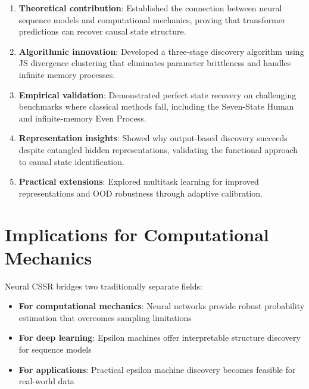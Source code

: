 \documentclass[11pt,a4paper]{report}
\theoremstyle{definition}
\begin{document}
\begin{enumerate}
    \item \textbf{Theoretical contribution}: Established the connection between neural sequence models and computational mechanics, proving that transformer predictions can recover causal state structure.
    
    \item \textbf{Algorithmic innovation}: Developed a three-stage discovery algorithm using JS divergence clustering that eliminates parameter brittleness and handles infinite memory processes.
    
    \item \textbf{Empirical validation}: Demonstrated perfect state recovery on challenging benchmarks where classical methods fail, including the Seven-State Human and infinite-memory Even Process.
    
    \item \textbf{Representation insights}: Showed why output-based discovery succeeds despite entangled hidden representations, validating the functional approach to causal state identification.
    
    \item \textbf{Practical extensions}: Explored multitask learning for improved representations and OOD robustness through adaptive calibration.
\end{enumerate}

\section{Implications for Computational Mechanics}
\label{sec:implications}

Neural CSSR bridges two traditionally separate fields:

\begin{notebox}
\begin{itemize}
    \item \textbf{For computational mechanics}: Neural networks provide robust probability estimation that overcomes sampling limitations
    \item \textbf{For deep learning}: Epsilon machines offer interpretable structure discovery for sequence models
    \item \textbf{For applications}: Practical epsilon machine discovery becomes feasible for real-world data
\end{itemize}
\end{notebox}
\end{document}
